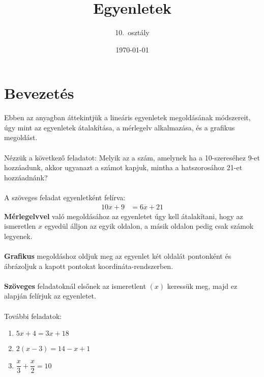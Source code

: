 \documentclass[12pt,a4paper]{article}
\title{Egyenletek}
\author{10.\ osztály}
\date{\today}
\begin{document}
\maketitle

\section*{Bevezetés}
\noindent Ebben az anyagban áttekintjük a lineáris egyenletek megoldásának módszereit, 
úgy mint az egyenletek átalakítása, a mérlegelv alkalmazása, és a grafikus megoldást.
 \\\\
\noindent Nézzük a következő feladatot: Melyik az a szám, amelynek ha a 10-szereséhez 9-et hozzáadunk, 
akkor ugyanazt a számot kapjuk, mintha a hatszorosához 21-et hozzáadnánk?
\\\\
\noindent A szöveges feladat egyenletként felírva:
\begin{align*}
    10x + 9 &= 6x +21
\end{align*}
\noindent \textbf{Mérlegelvvel} való megoldásához az egyenletet úgy kell átalakítani, hogy az ismeretlen $x$ egyedül álljon az egyik oldalon,
a másik oldalon pedig csak számok legyenek. 
\\\\
\noindent \textbf{Grafikus} megoldáshoz oldjuk meg az egyenlet két oldalát pontonként és ábrázoljuk a kapott pontokat koordináta-rendszerben.
\\\\
\noindent \textbf{Szöveges} feladatoknál elsőnek az ismeretlent $(x)$ keressük meg, majd ez alapján felírjuk az egyenletet.
\\\\
\noindent További feladatok:
\noindent
\begin{enumerate}[label=\alph*]
  \item \quad $5x + 4 = 3x + 18$
  \item \quad $2(x-3) = 14 - x+1$
  \item \quad $\dfrac{x}{3} + \dfrac{x}{2} = 10$
\end{enumerate}
\end{document}
